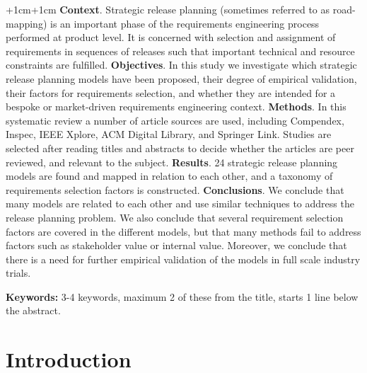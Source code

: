 \documentclass[a4paper,oneside]{bth}
\begin{document}
\abstract
\begin{changemargin}{+1cm}{+1cm}
\noindent
\textbf{Context}. Strategic release planning (sometimes referred to as
road-mapping) is an important phase of the requirements engineering process
performed at product level. It is concerned with selection and assignment of
requirements in sequences of releases such that important technical and resource
constraints are fulfilled.\newline
\textbf{Objectives}. In this study we investigate which strategic release
planning models have been proposed, their degree of empirical validation, their
factors for requirements selection, and whether they are intended for a bespoke
or market-driven requirements engineering context.\newline
\textbf{Methods}. In this systematic review a number of article sources are used,
including Compendex, Inspec, IEEE Xplore, ACM Digital Library, and Springer Link.
Studies are selected after reading titles and abstracts to decide whether the
articles are peer reviewed, and relevant to the subject.\newline
\textbf{Results}. 24 strategic release planning models are found and mapped in
relation to each other, and a taxonomy of requirements selection factors is
constructed.\newline
\textbf{Conclusions}. We conclude that many models are related to each other and
use similar techniques to address the release planning problem. We also conclude
that several requirement selection factors are covered in the different models,
but that many methods fail to address factors such as stakeholder value or
internal value. Moreover, we conclude that there is a need for further empirical
validation of the models in full scale industry trials.

\par\vspace {1cm}
\noindent
\textbf{Keywords:} 3-4 keywords, maximum 2 of these from the title, starts 1 line
below the abstract.

\end{changemargin}

\listoffigures %
\listoftables %
\listofalgorithms %
\tableofcontents 

\cleardoublepage
\pagestyle{headings}

\chapter{Introduction}

\end{document}
